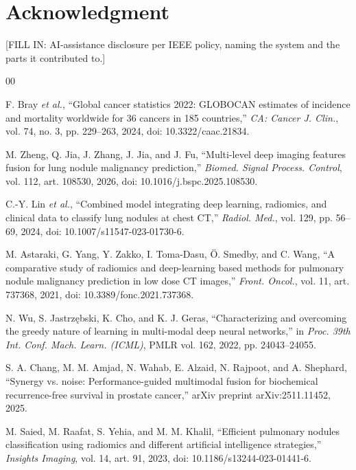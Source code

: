 \documentclass[conference]{IEEEtran}
\begin{document}
\section*{Acknowledgment}
[FILL IN: AI-assistance disclosure per IEEE policy, naming the system and the parts it contributed to.]

\begin{thebibliography}{00}

 F. Bray \emph{et al.}, ``Global cancer statistics 2022: GLOBOCAN estimates of incidence and mortality worldwide for 36 cancers in 185 countries,'' \textit{CA: Cancer J. Clin.}, vol. 74, no. 3, pp. 229--263, 2024, doi: 10.3322/caac.21834.

 M. Zheng, Q. Jia, J. Zhang, J. Jia, and J. Fu, ``Multi-level deep imaging features fusion for lung nodule malignancy prediction,'' \textit{Biomed. Signal Process. Control}, vol. 112, art. 108530, 2026, doi: 10.1016/j.bspc.2025.108530.

 C.-Y. Lin \emph{et al.}, ``Combined model integrating deep learning, radiomics, and clinical data to classify lung nodules at chest CT,'' \textit{Radiol. Med.}, vol. 129, pp. 56--69, 2024, doi: 10.1007/s11547-023-01730-6.

 M. Astaraki, G. Yang, Y. Zakko, I. Toma-Dasu, {\"O}. Smedby, and C. Wang, ``A comparative study of radiomics and deep-learning based methods for pulmonary nodule malignancy prediction in low dose CT images,'' \textit{Front. Oncol.}, vol. 11, art. 737368, 2021, doi: 10.3389/fonc.2021.737368.

 N. Wu, S. Jastrz{\k{e}}bski, K. Cho, and K. J. Geras, ``Characterizing and overcoming the greedy nature of learning in multi-modal deep neural networks,'' in \textit{Proc. 39th Int. Conf. Mach. Learn. (ICML)}, PMLR vol. 162, 2022, pp. 24043--24055.

 S. A. Chang, M. M. Amjad, N. Wahab, E. Alzaid, N. Rajpoot, and A. Shephard, ``Synergy vs. noise: Performance-guided multimodal fusion for biochemical recurrence-free survival in prostate cancer,'' arXiv preprint arXiv:2511.11452, 2025.

 M. Saied, M. Raafat, S. Yehia, and M. M. Khalil, ``Efficient pulmonary nodules classification using radiomics and different artificial intelligence strategies,'' \textit{Insights Imaging}, vol. 14, art. 91, 2023, doi: 10.1186/s13244-023-01441-6.


\end{thebibliography}
\end{document}
